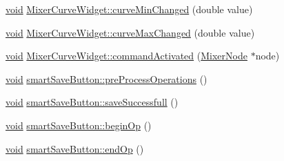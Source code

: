 \begin{DoxyCompactItemize}
\item 
\hyperlink{group___u_a_v_objects_plugin_ga444cf2ff3f0ecbe028adce838d373f5c}{void} \hyperlink{group___u_a_v_object_widget_utils_gac254f263b61538dfab5f1f2a06a7bb12}{\-Mixer\-Curve\-Widget\-::curve\-Min\-Changed} (double value)
\item 
\hyperlink{group___u_a_v_objects_plugin_ga444cf2ff3f0ecbe028adce838d373f5c}{void} \hyperlink{group___u_a_v_object_widget_utils_gabf78aa6aaa393045db87deb6a481c3b1}{\-Mixer\-Curve\-Widget\-::curve\-Max\-Changed} (double value)
\item 
\hyperlink{group___u_a_v_objects_plugin_ga444cf2ff3f0ecbe028adce838d373f5c}{void} \hyperlink{group___u_a_v_object_widget_utils_ga967ede8f3f93e35d68361368d7ce8d49}{\-Mixer\-Curve\-Widget\-::command\-Activated} (\hyperlink{class_mixer_node}{\-Mixer\-Node} $\ast$node)
\item 
\hyperlink{group___u_a_v_objects_plugin_ga444cf2ff3f0ecbe028adce838d373f5c}{void} \hyperlink{group___u_a_v_object_widget_utils_ga986b48d4e0086adbba03b2da6178524b}{smart\-Save\-Button\-::pre\-Process\-Operations} ()
\item 
\hyperlink{group___u_a_v_objects_plugin_ga444cf2ff3f0ecbe028adce838d373f5c}{void} \hyperlink{group___u_a_v_object_widget_utils_gafe5d25f2387fdd74204dec872a062f3e}{smart\-Save\-Button\-::save\-Successfull} ()
\item 
\hyperlink{group___u_a_v_objects_plugin_ga444cf2ff3f0ecbe028adce838d373f5c}{void} \hyperlink{group___u_a_v_object_widget_utils_ga84a531cfeea77f9e892321017dbcd705}{smart\-Save\-Button\-::begin\-Op} ()
\item 
\hyperlink{group___u_a_v_objects_plugin_ga444cf2ff3f0ecbe028adce838d373f5c}{void} \hyperlink{group___u_a_v_object_widget_utils_ga2e135b9ad9a743cd1b8b358069ffaf3e}{smart\-Save\-Button\-::end\-Op} ()
\end{DoxyCompactItemize}
